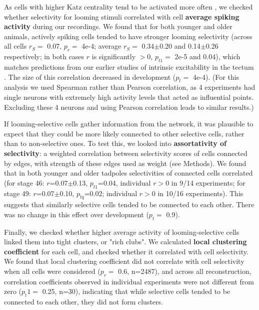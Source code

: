 \documentclass{article}
\begin{document}
As cells with higher Katz centrality tend to be activated more often \citep{fletcher2018katz}, we checked whether selectivity for looming stimuli correlated with cell \textbf{average spiking activity} during our recordings. We found that for both younger and older animals, actively spiking cells tended to have stronger looming selectivity (across all cells $r_S=$ 0.07, $p_r=$ 4e-4; average $r_S =$ 0.34$\pm$0.20 and 0.14$\pm$0.26 respectively; in both cases $r$ is significantly $>0$, $p_{t1}=$ 2e-5 and 0.04), which matches predictions from our earlier studies of intrinsic excitability in the tectum \citep{busch2019}. The size of this correlation decreased in development ($p_t=$ 4e-4). (For this analysis we used Spearman rather than Pearson correlation, as 4 experiments had single neurons with extremely high activity levels that acted as influential points. Excluding these 4 neurons and using Pearson correlation leads to similar results.) 

If looming-selective cells gather information from the network, it was plausible to expect that they could be more likely connected to other selective cells, rather than to non-selective ones. To test this, we looked into \textbf{assortativity of selectivity}: a weighted correlation between selectivity scores of cells connected by edges, with strength of these edges used as weight (see Methods). We found that in both younger and older tadpoles selectivities of connected cells correlated (for stage 46: $r$=0.07$\pm$0.13, $p_{t1}$=0.04, individual $r>$0 in 9/14 experiments; for stage 49: $r$=0.07$\pm$0.10, $p_{tq}$=0.02; individual $r>$0 in 10/16 experiments). This suggests that similarly selective cells tended to be connected to each other. There was no change in this effect over development ($p_t=$ 0.9).


Finally, we checked whether higher average activity of looming-selective cells linked them into tight clusters, or "rich clubs". We calculated \textbf{local clustering coefficient} for each cell, and checked whether it correlated with cell selectivity. We found that local clustering coefficient did not correlate with cell selectivity when all cells were considered ($p_r=$ 0.6, n=2487), and across all reconstruction, correlation coefficients observed in individual experiments were not different from zero ($p_t1=$ 0.25, n=30), indicating that while selective cells tended to be connected to each other, they did not form clusters.
\end{document}
